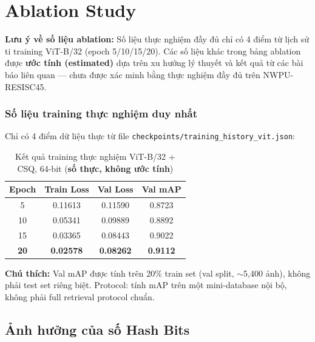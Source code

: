 \documentclass[13pt,a4paper]{article}
\begin{document}
\section{Ablation Study}

\textbf{Lưu ý về số liệu ablation:} Số liệu thực nghiệm đầy đủ chỉ có 4 điểm từ lịch sử ti training ViT-B/32 (epoch 5/10/15/20). Các số liệu khác trong bảng ablation được \textbf{ước tính (estimated)} dựa trên xu hướng lý thuyết và kết quả từ các bài báo liên quan --- chưa được xác minh bằng thực nghiệm đầy đủ trên NWPU-RESISC45.

\subsubsection{Số liệu training thực nghiệm duy nhất}

Chỉ có 4 điểm dữ liệu thực từ file \texttt{checkpoints/training\_history\_vit.json}:

\begin{table}[H]
\centering
\caption{Kết quả training thực nghiệm ViT-B/32 + CSQ, 64-bit (\textbf{số thực, không ước tính})}
\label{tab:real_results}
\begin{tabular}{cccc}
\toprule
\textbf{Epoch} & \textbf{Train Loss} & \textbf{Val Loss} & \textbf{Val mAP} \\
\midrule
5  & 0.11613 & 0.11590 & 0.8723 \\
10 & 0.05341 & 0.09889 & 0.8892 \\
15 & 0.03365 & 0.08443 & 0.9022 \\
\textbf{20} & \textbf{0.02578} & \textbf{0.08262} & \textbf{0.9112} \\
\bottomrule
\end{tabular}
\end{table}

\textbf{Chú thích:} Val mAP được tính trên 20\% train set (val split, $\sim$5{,}400 ảnh), không phải test set riêng biệt. Protocol: tính mAP trên một mini-database nội bộ, không phải full retrieval protocol chuẩn.

\subsection{Ảnh hưởng của số Hash Bits}
\end{document}
